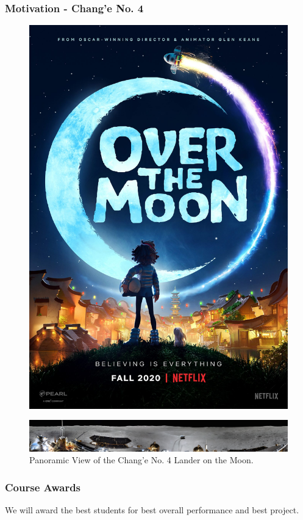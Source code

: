 \documentclass[10pt, compress]{beamer}
\begin{document}
\begin{frame}
  \frametitle{Motivation - Chang'e No. 4}
    \begin{figure}
  \centering
  \includegraphics[width=.35\linewidth]{overthemoon.jpeg}
\end{figure}
  \begin{figure}
  \centering
  \includegraphics[width=.85\linewidth]{change.jpg}
  \caption*{Panoramic View of the Chang'e No. 4 Lander on the Moon.}
\end{figure}
\end{frame}
\begin{frame}
  \frametitle{Course Awards}
  \begin{outline}
    \1 We will award the best students for best overall performance and best project. 
  \end{outline}
  \begin{figure}
   \hfil
  \end{figure}
\end{frame}
\end{document}
